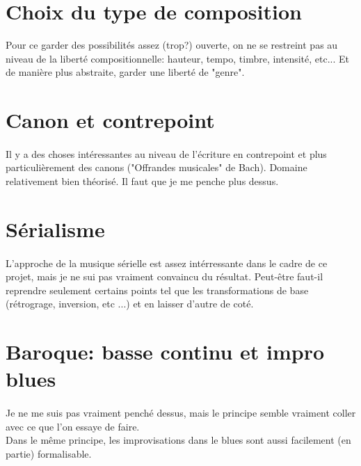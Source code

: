 \documentclass{article}
\begin{document}
  \section{Choix du type de composition} %
  \label{sec:Composition }
    Pour ce garder des possibilités assez (trop?) ouverte, on ne se restreint pas au
    niveau de la liberté compositionnelle: hauteur, tempo, timbre, intensité, etc...
    Et de manière plus abstraite, garder une liberté de "genre".

  \section{Canon et contrepoint} %
  \label{sec:Canon et contrepoint}
    \paragraph{} %
    \label{par:}
      Il y a des choses intéressantes au niveau de l'écriture en contrepoint et plus
      particulièrement des canons ("Offrandes musicales" de Bach). Domaine relativement
      bien théorisé. Il faut que je me penche plus dessus.

  \section{Sérialisme} %
  \label{sec:Serielisme}
    \paragraph{} %
    \label{par:}
    L'approche de la musique sérielle est assez intérressante dans le cadre de ce
    projet, mais je ne sui pas vraiment convaincu du résultat. Peut-être faut-il
    reprendre seulement certains points tel que les transformations de base
    (rétrograge, inversion, etc ...) et en laisser d'autre de coté.   

  \section{Baroque: basse continu et impro blues} %
  \label{sec:Baroque: basse continu}
    \paragraph{} %
    \label{par:}
      Je ne me suis pas vraiment penché dessus, mais le principe semble vraiment
      coller avec ce que l'on essaye de faire. \\
      Dans le même principe, les improvisations dans le blues sont aussi facilement
      (en partie) formalisable.
\end{document}
